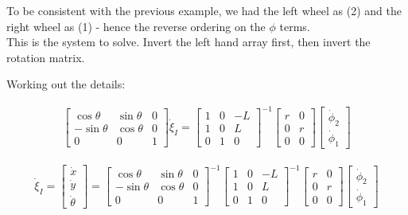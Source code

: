 To be consistent with the previous example, we had the left wheel as (2)
and the right wheel as (1) - hence the reverse ordering on the \(\phi\)
terms.\\
This is the system to solve. Invert the left hand array first, then
invert the rotation matrix.

Working out the details:

\[\begin{aligned}
\begin{bmatrix} \cos \theta & \sin \theta & 0 \\ -\sin \theta &
\cos \theta & 0 \\  0 & 0 & 1  \end{bmatrix}
 \dot{\xi}_I
= \begin{bmatrix} 1 & 0 & -L \\ 1 & 0 & L \\ 0 & 1 & 0 \end{bmatrix}^{-1}
\begin{bmatrix} r & 0 \\ 0 & r \\0& 0\end{bmatrix}
\begin{bmatrix}\dot{\phi}_2 \\ \dot{\phi}_1\end{bmatrix}
\end{aligned}\]

\[\begin{aligned}
\dot{\xi}_I =  \begin{bmatrix}\dot{x} \\ \dot{y} \\ \dot{\theta} \end{bmatrix}
= \begin{bmatrix} \cos \theta & \sin \theta & 0 \\ -\sin \theta &
\cos \theta & 0 \\  0 & 0 & 1  \end{bmatrix}^{-1}
\begin{bmatrix} 1 & 0 & -L \\ 1 & 0 & L \\ 0 & 1 & 0 \end{bmatrix}^{-1}
\begin{bmatrix} r & 0 \\ 0 & r \\0& 0\end{bmatrix}
\begin{bmatrix}\dot{\phi}_2 \\ \dot{\phi}_1\end{bmatrix}
\end{aligned}\]

